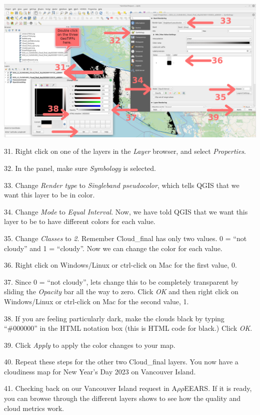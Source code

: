 \documentclass[oneside,a4paper,11pt,explicit]{book}
\begin{document}
	\centerline{\includegraphics[width=.875\textwidth]{Cloud_final_AddLayer.png}}
	
	31. Right click on one of the layers in the \textit{Layer} browser, and select \textit{Properties}.
	
	32. In the panel, make sure \textit{Symbology} is selected.
	
	33. Change \textit{Render type} to \textit{Singleband pseudocolor}, which tells QGIS that we want this layer to be in color.
	
	34. Change \textit{Mode} to \textit{Equal Interval}. Now, we have told QGIS that we want this layer to be to have different colors for each value. 
	
	35. Change \textit{Classes} to \textit{2}. Remember Cloud\_final has only two values. 0 = ``not cloudy'' and 1 = ``cloudy''. Now we can change the color for each value.
	
	36. Right click on Windows/Linux or ctrl-click on Mac for the first value, 0. 
	
	37. Since 0 = ``not cloudy'', lets change this to be completely transparent by sliding the \textit{Opacity} bar all the way to zero. Click \textit{OK} and then right click on Windows/Linux or ctrl-click on Mac for the second value, 1. 
	
	38. If you are feeling particularly dark, make the clouds black by typing ``\#000000'' in the HTML notation box (this is HTML code for black.) Click \textit{OK}.
	
	39. Click \textit{Apply} to apply the color changes to your map.
	
	40. Repeat these steps for the other two Cloud\_final layers. You now have a cloudiness map for New Year's Day 2023 on Vancouver Island.
	
	41. Checking back on our Vancouver Island request in A$\rho\rho$EEARS. If it is ready, you can browse through the different layers shows to see how the quality and cloud metrics work. 
	
\end{document}
